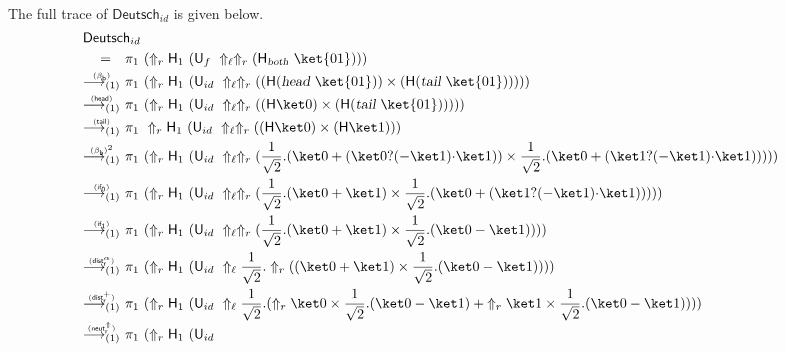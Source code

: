 \documentclass[preprint]{elsarticle}
\newcommand\lra[1][1]{\longrightarrow_{\left(#1\right)}}
\newcommand\ite[3]{{#1}?{#2}\mathord{\cdot}{#3}}
\newcommand\pair[2]{({#1}+{#2})}
\newcommand\npair[2]{({#1}-{#2})}
\newcommand\s[1]{\ensuremath{\mathsf{#1}}}
\newcommand\head{\text{\sl head}}
\newcommand\tail{\text{\sl tail}}
\newcommand\red[2][1]{\overset{\scriptscriptstyle\smash{#2}\vphantom{x}}{\lra[#1]}\ }
\newcommand\rbetab{(\s{\beta_b})}
\newcommand\riftrue{(\s{if_{1}})}
\newcommand\riffalse{(\s{if_{0}})}
\newcommand\rcaneutr{(\s{neut^\Uparrow_r})}
\newcommand\rhead{(\s{head})}
\newcommand\rtail{(\s{tail})}
\newcommand\rdistscalr{(\s{dist^\alpha_r})}
\newcommand\rdistsumr{(\s{dist^+_r})}
\begin{document}
The full trace of $\s{Deutsch}_{id}$ is given below.
\begin{align*}
  \omit\rlap{\parbox{\textwidth}{$\s{Deutsch}_{id}$}}\\
  =\quad &
           \pi_1~(\Uparrow_r \s H_1~(\s U_f~\Uparrow_\ell\Uparrow_r (\s H_{\textsl{both}}~\ket{01})))\\
  \red\rbetab&
               \pi_1\ (\Uparrow_r \s H_1\ (\s U_{id}\
               \Uparrow_\ell\Uparrow_r ((\s H(\head~\ket{01}))\times(\s H(\tail~\ket{01})))))
  \\
  \red\rhead&
              \pi_1\ (\Uparrow_r \s H_1\ (\s U_{id}\
              \Uparrow_\ell\Uparrow_r ((\s H\ket 0)\times(\s H(\tail~\ket{01})))))\\
  \red\rtail&
              \pi_1\ \Uparrow_r \s H_1\ (\s U_{id}\
              \Uparrow_\ell\Uparrow_r ((\s H\ket 0)\times(\s H\ket 1)))\\
  \red{\rbetab^2}&
                   \pi_1\ (\Uparrow_r \s H_1\ (\s U_{id}\
                   \Uparrow_\ell\Uparrow_r (
                   \frac 1{\sqrt 2}.\pair{\ket 0}{(\ite{\ket 0}{(-\ket 1)}{\ket 1})}
                   \times
                   \frac 1{\sqrt 2}.\pair{\ket 0}{(\ite{\ket 1}{(-\ket 1)}{\ket 1})}
                   )))
  \\
  \red\riffalse&
                 \pi_1\ (\Uparrow_r \s H_1\ (\s U_{id}\
                 \Uparrow_\ell\Uparrow_r (
                 \frac 1{\sqrt 2}.\pair{\ket 0}{\ket 1}
                 \times
                 \frac 1{\sqrt 2}.\pair{\ket 0}{(\ite{\ket 1}{(-\ket 1)}{\ket 1})}
                 )))
  \\
  \red\riftrue&
                \pi_1\ (\Uparrow_r \s H_1\ (\s U_{id}\
                \Uparrow_\ell\Uparrow_r (\frac 1{\sqrt 2}.\pair{\ket 0}{\ket 1}\times\frac 1{\sqrt 2}.\npair{\ket 0}{\ket 1}
                )))
  \\
  \red\rdistscalr&
                   \pi_1\ (\Uparrow_r \s H_1\ (\s U_{id}\
                   \Uparrow_\ell\frac 1{\sqrt 2}.\Uparrow_r(\pair{\ket 0}{\ket 1}\times\frac 1{\sqrt 2}.\npair{\ket 0}{\ket 1}
                   )))
  \\
  \red\rdistsumr&
                  \pi_1\ (\Uparrow_r \s H_1\ (\s U_{id}\
                  \Uparrow_\ell\frac 1{\sqrt 2}.
                  ( {\Uparrow_r
                  \ket 0\times\frac 1{\sqrt 2}.\npair{\ket 0}{\ket 1}}
                  + {\Uparrow_r \ket
                  1\times\frac 1{\sqrt 2}.\npair{\ket 0}{\ket 1}})))
  \\
  \red\rcaneutr&
                 \pi_1\ (\Uparrow_r \s H_1\ (\s U_{id}\

\end{align*}
\end{document}
